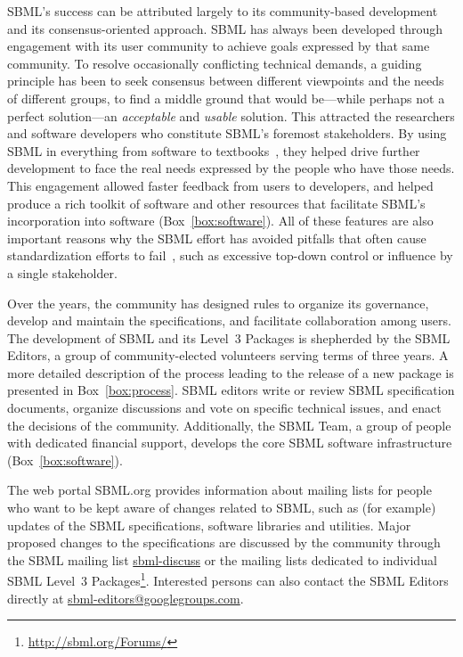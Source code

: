 \documentclass[]{draft-sbml-paper}
\begin{document}
SBML's success can be attributed largely to its community-based development and its consensus-oriented approach. SBML has always been developed through engagement with its user community to achieve goals expressed by that same community. To resolve occasionally conflicting technical demands, a guiding principle has been to seek consensus between different viewpoints and the needs of different groups, to find a middle ground that would be---while perhaps not a perfect solution---an \emph{acceptable} and \emph{usable} solution. This attracted the researchers and software developers who constitute SBML's foremost stakeholders. By using SBML in everything from software to textbooks~\citep{Cesario2011cancer, Sullivan2012introduction, Wilkinson2018stochastic, Klipp2016systems, Choi2010systems, Govindjee2009photosynthesis, Liu2009systems, Choi2008introduction, Sauro2014systems, DiStefano2015dynamic}, they helped drive further development to face the real needs expressed by the people who have those needs.  This engagement allowed faster feedback from users to developers, and helped produce a rich toolkit of software and other resources that facilitate SBML's incorporation into software (Box~\ref{box:software}).  All of these features are also important reasons why the SBML effort has avoided pitfalls that often cause standardization efforts to fail~\citep{Cargill2011why}, such as excessive top-down control or influence by a single stakeholder.

Over the years, the community has designed rules to organize its governance, develop and maintain the specifications, and facilitate collaboration among users.  The development of SBML and its Level~3 Packages is shepherded by the SBML Editors, a group of community-elected volunteers serving terms of three years. A more detailed description of the process leading to the release of a new package is presented in Box~\ref{box:process}. SBML editors write or review SBML specification documents, organize discussions and vote on specific technical issues, and enact the decisions of the community. Additionally, the SBML Team, a group of people with dedicated financial support, develops the core SBML software infrastructure (Box~\ref{box:software}).

The web portal SBML.org provides information about mailing lists for people who want to be kept aware of changes related to SBML, such as (for example) updates of the SBML specifications, software libraries and utilities.  Major proposed changes to the specifications are discussed by the community through the SBML mailing list \url{sbml-discuss} or the mailing lists dedicated to individual SBML Level~3 Packages\footnote{\url{http://sbml.org/Forums/}}.  Interested persons can also contact the SBML Editors directly at \url{sbml-editors@googlegroups.com}.
\end{document}
